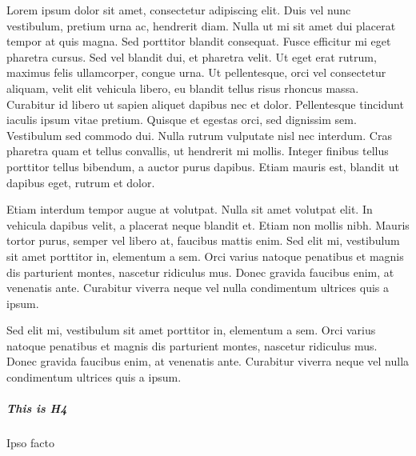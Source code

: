 

\pagestyle{empty}
\sphinxmaketitle
\pagestyle{plain}
\sphinxtableofcontents
\pagestyle{normal}
\label{\detokenize{intro::doc}}


\sphinxAtStartPar
Lorem ipsum dolor sit amet, consectetur adipiscing elit. Duis vel nunc vestibulum, pretium urna ac, hendrerit diam. Nulla ut mi sit amet dui placerat tempor at quis magna. Sed porttitor blandit consequat. Fusce efficitur mi eget pharetra cursus. Sed vel blandit dui, et pharetra velit. Ut eget erat rutrum, maximus felis ullamcorper, congue urna. Ut pellentesque, orci vel consectetur aliquam, velit elit vehicula libero, eu blandit tellus risus rhoncus massa. Curabitur id libero ut sapien aliquet dapibus nec et dolor. Pellentesque tincidunt iaculis ipsum vitae pretium. Quisque et egestas orci, sed dignissim sem. Vestibulum sed commodo dui. Nulla rutrum vulputate nisl nec interdum. Cras pharetra quam et tellus convallis, ut hendrerit mi mollis. Integer finibus tellus porttitor tellus bibendum, a auctor purus dapibus. Etiam mauris est, blandit ut dapibus eget, rutrum et dolor.

\begin{DUlineblock}{0em}
\item[] 
\end{DUlineblock}

\sphinxAtStartPar
Etiam interdum tempor augue at volutpat. Nulla sit amet volutpat elit. In vehicula dapibus velit, a placerat neque blandit et. Etiam non mollis nibh. Mauris tortor purus, semper vel libero at, faucibus mattis enim. Sed elit mi, vestibulum sit amet porttitor in, elementum a sem. Orci varius natoque penatibus et magnis dis parturient montes, nascetur ridiculus mus. Donec gravida faucibus enim, at venenatis ante. Curabitur viverra neque vel nulla condimentum ultrices quis a ipsum.

\begin{DUlineblock}{0em}
\item[] 
\end{DUlineblock}

\sphinxAtStartPar
Sed elit mi, vestibulum sit amet porttitor in, elementum a sem. Orci varius natoque penatibus et magnis dis parturient montes, nascetur ridiculus mus. Donec gravida faucibus enim, at venenatis ante. Curabitur viverra neque vel nulla condimentum ultrices quis a ipsum.
\subparagraph{This is H4}
\label{\detokenize{intro:this-is-the-intro}}
\sphinxAtStartPar
Ipso facto


